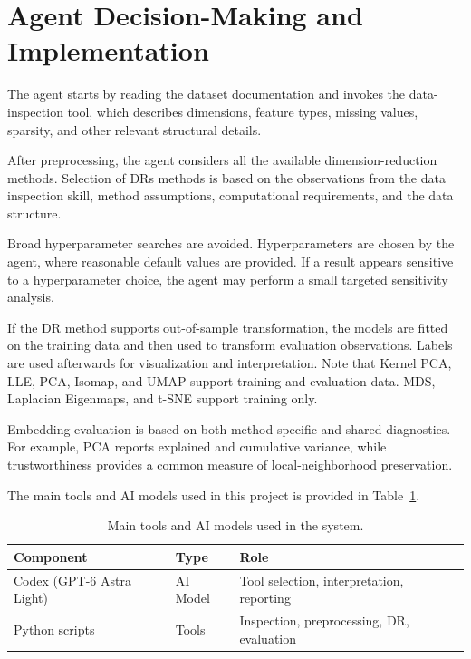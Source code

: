 \documentclass[10pt]{article}
\begin{document}
\section{Agent Decision-Making and Implementation}

The agent starts by reading the dataset documentation and invokes the data-inspection tool, which describes dimensions, feature types, missing values, sparsity, and other relevant structural details. 

After preprocessing, the agent considers all the available dimension-reduction methods. Selection of DRs methods is based on the observations from the data inspection skill, method assumptions, computational requirements, and the data structure. 

Broad hyperparameter searches are avoided. Hyperparameters are chosen by the agent, where reasonable default values are provided. If a result appears sensitive to a hyperparameter choice, the agent may perform a small targeted sensitivity analysis. 

If the DR method supports out-of-sample transformation, the models are fitted on the training data and then used to transform evaluation observations. Labels are used afterwards for visualization and interpretation. Note that Kernel PCA, LLE, PCA, Isomap, and UMAP support training and evaluation data. MDS, Laplacian Eigenmaps, and t-SNE support training only.

Embedding evaluation is based on both method-specific and shared diagnostics. For example, PCA reports explained and cumulative variance, while trustworthiness provides a common measure of local-neighborhood preservation.

The main tools and AI models used in this project is provided in Table~\ref{tab:tools}.

\begin{table}[H]
    \centering
    \small
    \setlength{\tabcolsep}{5pt}

    \begin{tabular}{lll}
        \toprule
        \textbf{Component} & \textbf{Type} & \textbf{Role} \\
        \midrule
        Codex (GPT-6 Astra Light) & AI Model & Tool selection, interpretation, reporting \\
        Python scripts & Tools & Inspection, preprocessing, DR, evaluation \\
        \bottomrule
    \end{tabular}

    \caption{Main tools and AI models used in the system.}
    \label{tab:tools}
\end{table}
\end{document}
